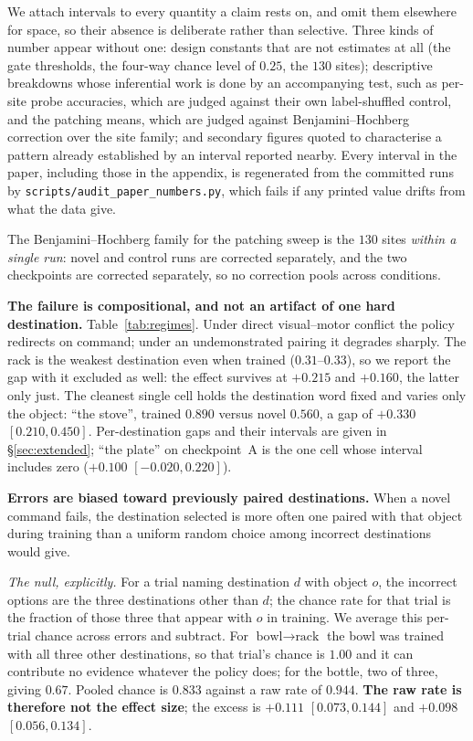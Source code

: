 \documentclass{article}
\begin{document}
We attach intervals to every quantity a claim rests on, and omit them elsewhere for space, so
their absence is deliberate rather than selective. Three kinds of number appear without one:
design constants that are not estimates at all (the gate thresholds, the four-way chance level
of $0.25$, the $130$ sites); descriptive breakdowns whose inferential work is done by an
accompanying test, such as per-site probe accuracies, which are judged against their own
label-shuffled control, and the patching means, which are judged against
Benjamini--Hochberg correction over the site family; and secondary figures quoted to
characterise a pattern already established by an interval reported nearby. Every interval in
the paper, including those in the appendix, is regenerated from the committed runs by
\texttt{scripts/audit\_paper\_numbers.py}, which fails if any printed value drifts from what
the data give.

The Benjamini--Hochberg family for the patching sweep is the $130$ sites \emph{within a single
run}: novel and control runs are corrected separately, and the two checkpoints are corrected
separately, so no correction pools across conditions.

\textbf{The failure is compositional, and not an artifact of one hard destination.}
Table~\ref{tab:regimes}. Under direct visual--motor conflict the policy redirects on command;
under an undemonstrated pairing it degrades sharply. The rack is the weakest destination even
when trained ($0.31$--$0.33$), so we report the gap with it excluded as well: the effect
survives at $+0.215$ and $+0.160$, the latter only just. The cleanest single cell holds the
destination word fixed and varies only the object: ``the stove'', trained $0.890$ versus novel
$0.560$, a gap of $+0.330$ $[0.210, 0.450]$. Per-destination gaps and their intervals are given
in \S\ref{sec:extended}; ``the plate'' on checkpoint~A is the one cell whose interval includes
zero ($+0.100$ $[-0.020, 0.220]$).

\textbf{Errors are biased toward previously paired destinations.} When a novel command
fails, the destination selected is more often one paired with that object during training than
a uniform random choice among incorrect destinations would give.

\emph{The null, explicitly.} For a trial naming destination $d$ with object $o$, the incorrect
options are the three destinations other than $d$; the chance rate for that trial is the
fraction of those three that appear with $o$ in training. We average this per-trial chance
across errors and subtract. For $\textrm{bowl} \to \textrm{rack}$ the bowl was trained with all
three other destinations, so that trial's chance is $1.00$ and it can contribute no evidence
whatever the policy does; for the bottle, two of three, giving $0.67$. Pooled chance is
$0.833$ against a raw rate of $0.944$. \textbf{The raw rate is therefore not the effect size};
the excess is $+0.111$ $[0.073, 0.144]$ and $+0.098$ $[0.056, 0.134]$.
\end{document}
